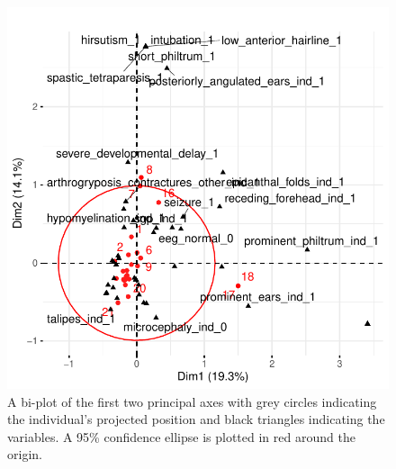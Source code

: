 \documentclass[
  authoryear,
  preprint,
  3p]{elsarticle}
\begin{document}
\begin{figure}

{\centering \includegraphics{paper_files/figure-pdf/fig-biplotprelim-1.pdf}

}

\caption{\label{fig-biplotprelim}A bi-plot of the first two principal
axes with grey circles indicating the individual's projected position
and black triangles indicating the variables. A 95\% confidence ellipse
is plotted in red around the origin.}

\end{figure}
\end{document}
